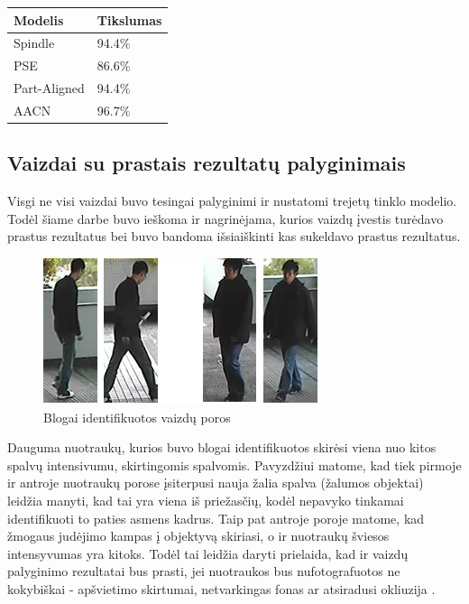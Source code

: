 \documentclass{VUMIFPSkursinis}
\DeclareRobustCommand{\[}{\begin{equation}}
\DeclareRobustCommand{\]}{\end{equation}}
\begin{document}
\begin{center}
\begin{tabular}{ | m{7em} | m{5em}| } 
\hline
Modelis & Tikslumas \\
\hline
Spindle & 94.4\% \\
\hline
PSE & 86.6\% \\
\hline
Part-Aligned& 94.4\% \\
\hline
AACN & 96.7\% \\
\hline
\end{tabular}
\end{center}

\pagebreak

\subsection{Vaizdai su prastais rezultatų palyginimais}
Visgi ne visi vaizdai buvo tesingai palyginimi ir nustatomi trejetų tinklo modelio. Todėl šiame darbe buvo ieškoma ir nagrinėjama, kurios vaizdų įvestis turėdavo prastus rezultatus bei buvo bandoma išsiaiškinti kas sukeldavo prastus rezultatus.

\begin{figure}[H]
\centering
\includegraphics[scale=1.0]{img/Wrongly_detected.png}
\caption{Blogai identifikuotos vaizdų poros} %
\label{img:mlp}
\end{figure}

Dauguma nuotraukų, kurios buvo blogai identifikuotos skirėsi viena nuo kitos spalvų intensivumu, skirtingomis spalvomis. Pavyzdžiui matome, kad tiek pirmoje ir antroje nuotraukų porose įsiterpusi nauja žalia spalva (žalumos objektai) leidžia manyti, kad tai yra viena iš priežasčių, kodėl nepavyko tinkamai identifikuoti to paties asmens kadrus. Taip pat antroje poroje matome, kad žmogaus judėjimo kampas į objektyvą skiriasi, o ir nuotraukų šviesos intensyvumas yra kitoks. Todėl tai leidžia daryti prielaida, kad ir vaizdų palyginimo rezultatai bus prasti, jei nuotraukos bus nufotografuotos ne kokybiškai - apšvietimo skirtumai, netvarkingas fonas ar atsiradusi okliuzija \cite{Person_reindentification}.
\pagebreak
\end{document}
